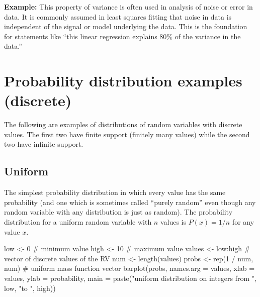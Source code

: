 \documentclass[
  letterpaper,
  DIV=11,
  numbers=noendperiod]{scrreprt}
\newenvironment{Shaded}{\begin{snugshade}}{\end{snugshade}}
\newcommand{\AttributeTok}[1]{\textcolor[rgb]{0.40,0.45,0.13}{#1}}
\newcommand{\CommentTok}[1]{\textcolor[rgb]{0.37,0.37,0.37}{#1}}
\newcommand{\DecValTok}[1]{\textcolor[rgb]{0.68,0.00,0.00}{#1}}
\newcommand{\FunctionTok}[1]{\textcolor[rgb]{0.28,0.35,0.67}{#1}}
\newcommand{\NormalTok}[1]{\textcolor[rgb]{0.00,0.23,0.31}{#1}}
\newcommand{\OtherTok}[1]{\textcolor[rgb]{0.00,0.23,0.31}{#1}}
\newcommand{\SpecialCharTok}[1]{\textcolor[rgb]{0.37,0.37,0.37}{#1}}
\newcommand{\StringTok}[1]{\textcolor[rgb]{0.13,0.47,0.30}{#1}}
\begin{document}
\textbf{Example:} This property of variance is often used in analysis of
noise or error in data. It is commonly assumed in least squares fitting
that noise in data is independent of the signal or model underlying the
data. This is the foundation for statements like ``this linear
regression explains 80\% of the variance in the data.''

\hypertarget{probability-distribution-examples-discrete}{%
\section{Probability distribution examples
(discrete)}\label{probability-distribution-examples-discrete}}

The following are examples of distributions of random variables with
discrete values. The first two have finite support (finitely many
values) while the second two have infinite support.

\hypertarget{uniform}{%
\subsection{Uniform}\label{uniform}}

The simplest probability distribution in which every value has the same
probability (and one which is sometimes called ``purely random'' even
though any random variable with any distribution is just as random). The
probability distribution for a uniform random variable with \(n\) values
is \(P(x) = 1/n\) for any value \(x\).

\begin{Shaded}
\begin{Highlighting}[]
\NormalTok{low }\OtherTok{\textless{}{-}} \DecValTok{0} \CommentTok{\# minimum value}
\NormalTok{high }\OtherTok{\textless{}{-}} \DecValTok{10} \CommentTok{\# maximum value}
\NormalTok{values }\OtherTok{\textless{}{-}}\NormalTok{ low}\SpecialCharTok{:}\NormalTok{high }\CommentTok{\# vector of discrete values of the RV}
\NormalTok{num }\OtherTok{\textless{}{-}} \FunctionTok{length}\NormalTok{(values)}
\NormalTok{probs }\OtherTok{\textless{}{-}} \FunctionTok{rep}\NormalTok{(}\DecValTok{1} \SpecialCharTok{/}\NormalTok{ num, num) }\CommentTok{\# uniform mass function vector}
\FunctionTok{barplot}\NormalTok{(probs, }\AttributeTok{names.arg =}\NormalTok{ values, }\AttributeTok{xlab =} \StringTok{\textquotesingle{}values\textquotesingle{}}\NormalTok{, }\AttributeTok{ylab =} \StringTok{\textquotesingle{}probability\textquotesingle{}}\NormalTok{,}
        \AttributeTok{main =} \FunctionTok{paste}\NormalTok{(}\StringTok{"uniform  distribution on integers from "}\NormalTok{, low, }\StringTok{"to "}\NormalTok{, high))}
\end{Highlighting}
\end{Shaded}
\end{document}

